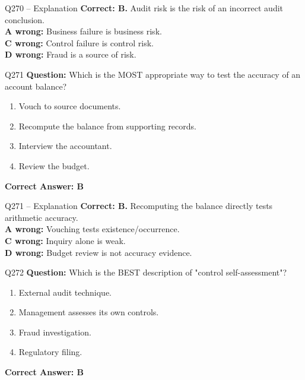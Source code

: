 \documentclass[aspectratio=169,10pt]{beamer}
\begin{document}
	\begin{frame}[t]{Q270 -- Explanation}
		\small
		\textbf{Correct: B.} Audit risk is the risk of an incorrect audit conclusion. \\[4pt]
		\textbf{A wrong:} Business failure is business risk. \\[2pt]
		\textbf{C wrong:} Control failure is control risk. \\[2pt]
		\textbf{D wrong:} Fraud is a source of risk.
	\end{frame}
	
	\begin{frame}[t]{Q271}
		\small
		\textbf{Question:} Which is the MOST appropriate way to test the accuracy of an account balance?
		\begin{enumerate}[label=\Alph*.,itemsep=1pt,topsep=2pt]
			\item Vouch to source documents.
			\item Recompute the balance from supporting records.
			\item Interview the accountant.
			\item Review the budget.
		\end{enumerate}
		\vspace{4pt}
		\textbf{Correct Answer: B}
	\end{frame}
	
	\begin{frame}[t]{Q271 -- Explanation}
		\small
		\textbf{Correct: B.} Recomputing the balance directly tests arithmetic accuracy. \\[4pt]
		\textbf{A wrong:} Vouching tests existence/occurrence. \\[2pt]
		\textbf{C wrong:} Inquiry alone is weak. \\[2pt]
		\textbf{D wrong:} Budget review is not accuracy evidence.
	\end{frame}
	
	\begin{frame}[t]{Q272}
		\small
		\textbf{Question:} Which is the BEST description of "control self-assessment"?
		\begin{enumerate}[label=\Alph*.,itemsep=1pt,topsep=2pt]
			\item External audit technique.
			\item Management assesses its own controls.
			\item Fraud investigation.
			\item Regulatory filing.
		\end{enumerate}
		\vspace{4pt}
		\textbf{Correct Answer: B}
	\end{frame}
	
\end{document}
